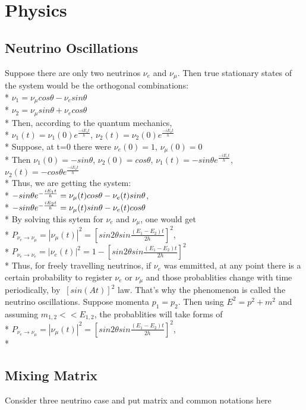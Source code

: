 \section{Physics}
\subsection{Neutrino Oscillations}
Suppose there are only two neutrinos $\nu_e$ and $\nu_{\mu}$. Then true stationary states of the system would be the orthogonal combinations:\\*
$\nu_1=\nu_{\mu}cos\theta-\nu_esin\theta$\\*
$\nu_2=\nu_{\mu}sin\theta+\nu_ecos\theta$\\*
Then, according to the quantum mechanics,\\*
$\nu_1(t)=\nu_1(0)e^{\frac{-iE_1t}{h}}$, $\nu_2(t)=\nu_2(0)e^{\frac{-iE_2t}{h}}$\\*
Suppose, at t=0 there were $\nu_e(0)=1$, $\nu_\mu(0)=0$\\*
Then $\nu_1(0)=-sin\theta$, $\nu_2(0)=cos\theta$, $\nu_1(t)=-{sin\theta}e^{\frac{-iE_1t}{h}}$, $\nu_2(t)=-{cos\theta}e^{\frac{-iE_2t}{h}}$\\*
Thus, we are getting the system:\\*
$-{sin\theta}e^{-{{iE_1t} \over h}}=\nu_\mu(t)cos\theta-\nu_e(t)sin\theta$,\\*
$-{sin\theta}e^{-{{iE_2t} \over h}}=\nu_\mu(t)sin\theta-\nu_e(t)cos\theta$\\*
By solving this sytem for $\nu_e$ and $\nu_\mu$, one would get\\*
$P_{\nu_e \rightarrow \nu_\mu}=|\nu_\mu(t)|^2=[{sin2\theta}sin{\frac{(E_1-E_2)t}{2h}}]^2$,\\*
$P_{\nu_e \rightarrow \nu_e}=|\nu_e(t)|^2=1-[{sin2\theta}sin{\frac{(E_1-E_2)t}{2h}}]^2$\\*
Thus, for freely travelling neutrinos, if $\nu_e$ was emmitted, at any point there is a certain probability to register $\nu_e$ or $\nu_\mu$ and those probablities change with time periodically, by $~[sin(At)]^2$ law. That's why the phenomenon is called the neutrino oscillations.
Suppose momenta $p_1=p_2$. Then using $E^2=p^2+m^2$ and assuming $m_{1,2}<<E_{1,2}$, the probablities will take forms of\\*
$P_{\nu_e \rightarrow \nu_\mu}=|\nu_\mu(t)|^2=[{sin2\theta}sin{\frac{(E_1-E_2)t}{2h}}]^2$,\\*  
\subsection{Mixing Matrix}
Consider three neutrino case and put matrix and common notations here
